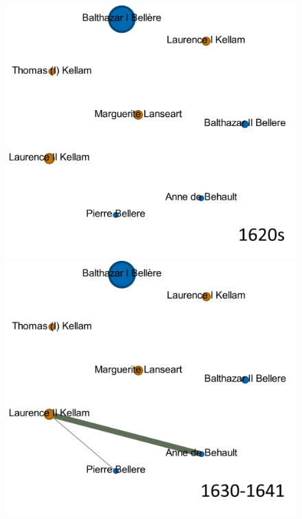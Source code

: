 \documentclass[12pt,a4paper,oneside]{book}
\begin{document}
\begin{sloppypar}
\begin{figure}[H]
\includegraphics[scale=0.32]{graph/B&K_1620s.png}
\includegraphics[scale=0.32]{graph/B&K_1630-1641.png}

\end{figure}
\end{sloppypar}
\end{document}
